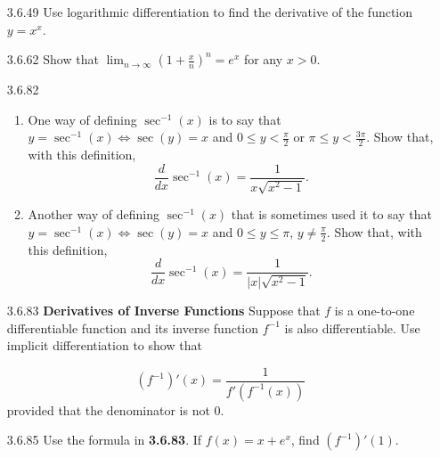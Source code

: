 \documentclass{article}
\begin{document}
\begin{enumerate}
\newpage

\item[3.6.49]
    Use logarithmic differentiation to find the derivative of the function $y = x^{x}$.

\vspace{6cm}

\item[3.6.62]
    Show that $\displaystyle \lim_{n \to \infty} \left( 1 + \frac{x}{n} \right)^{n} = e^{x}$ for any $x > 0$.

\vspace{6cm}

\item[3.6.82]
    \begin{enumerate}
        \item
            One way of defining $\sec^{-1}(x)$ is to say that $y = \sec^{-1}(x) \iff \sec (y) = x  $
            and $0 \leq  y < \frac{\pi }{2}$ or $ \pi \leq  y <  \frac{3\pi}{2}$.
            Show that, with this definition,
            \[
                \frac{d}{dx} \sec^{-1} (x) = \frac{1}{x \sqrt{x^{2} - 1}}.
            \]
        \item
            Another way of defining $\sec^{-1} (x) $ that is sometimes used it to say
            that $y = \sec^{-1} (x) \iff \sec (y) = x  $ and $0 \leq y \leq \pi $, $y \neq \frac{ \pi  }{2}$.
            Show that, with this definition,
            \[
                \frac{d}{dx} \sec^{-1} (x) = \frac{1}{|x| \sqrt{x^{2} - 1}}.
            \]
    \end{enumerate}

\newpage

\item[3.6.83]
    \textbf{Derivatives of Inverse Functions} Suppose that $f$ is a one-to-one differentiable
    function and its inverse function $f^{-1}$ is also differentiable. Use
    implicit differentiation to show that

    \[
        (f^{-1})'(x) = \frac{1}{f'(f^{-1}(x))}
    \]
    provided that the denominator is not $0$.

\vspace{6cm}

\item[3.6.85]
    Use the formula in \textbf{3.6.83}. If $f(x) = x + e^{x}$, find $(f^{-1})'(1)$.

\end{enumerate}
\end{document}
